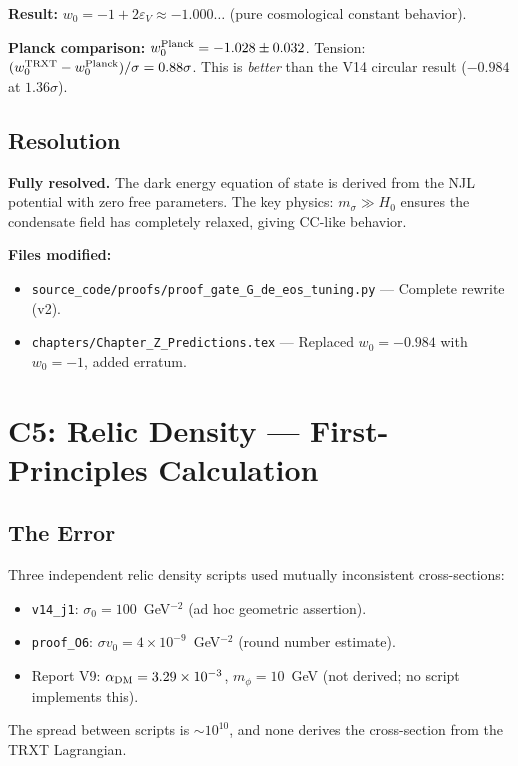 \documentclass[11pt,a4paper]{article}
\begin{document}
\textbf{Result:} $w_0 = -1 + 2\varepsilon_V \approx -1.000\ldots$ (pure cosmological constant behavior).

\textbf{Planck comparison:} $w_0^{\rm Planck} = -1.028 \pm 0.032$.  Tension: $(w_0^{\rm TRXT} - w_0^{\rm Planck})/\sigma = 0.88\sigma$.  This is \emph{better} than the V14 circular result ($-0.984$ at $1.36\sigma$).

\subsection{Resolution}
\begin{mdframed}[backgroundcolor=green!5]
\textbf{Fully resolved.}  The dark energy equation of state is derived from the NJL potential with zero free parameters.  The key physics: $m_\sigma \gg H_0$ ensures the condensate field has completely relaxed, giving CC-like behavior.
\end{mdframed}

\textbf{Files modified:}
\begin{itemize}
    \item \texttt{source\_code/proofs/proof\_gate\_G\_de\_eos\_tuning.py} --- Complete rewrite (v2).
    \item \texttt{chapters/Chapter\_Z\_Predictions.tex} --- Replaced $w_0 = -0.984$ with $w_0 = -1$, added erratum.
\end{itemize}

\section{C5: Relic Density --- First-Principles Calculation}
\label{sec:C5}

\subsection{The Error}
Three independent relic density scripts used mutually inconsistent cross-sections:
\begin{itemize}
    \item \texttt{v14\_j1}: $\sigma_0 = 100$~GeV$^{-2}$ (ad hoc geometric assertion).
    \item \texttt{proof\_O6}: $\sigma v_0 = 4 \times 10^{-9}$~GeV$^{-2}$ (round number estimate).
    \item Report V9: $\alpha_{\rm DM} = 3.29 \times 10^{-3}$, $m_\phi = 10$~GeV (not derived; no script implements this).
\end{itemize}
The spread between scripts is $\sim 10^{10}$, and none derives the cross-section from the TRXT Lagrangian.
\end{document}
